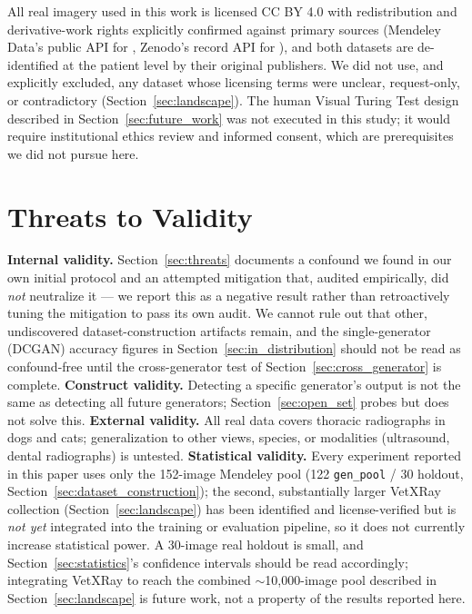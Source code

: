 \documentclass[journal]{IEEEtran}
\begin{document}
All real imagery used in this work is licensed CC BY 4.0 with redistribution and derivative-work rights explicitly confirmed against primary sources (Mendeley Data's public API for \cite{mendeley_vhs_dataset}, Zenodo's record API for \cite{vetxray_2026}), and both datasets are de-identified at the patient level by their original publishers. We did not use, and explicitly excluded, any dataset whose licensing terms were unclear, request-only, or contradictory (Section~\ref{sec:landscape}). The human Visual Turing Test design described in Section~\ref{sec:future_work} was not executed in this study; it would require institutional ethics review and informed consent, which are prerequisites we did not pursue here.

\section{Threats to Validity}
\label{sec:validity}

\textbf{Internal validity.} Section~\ref{sec:threats} documents a confound we found in our own initial protocol and an attempted mitigation that, audited empirically, did \emph{not} neutralize it — we report this as a negative result rather than retroactively tuning the mitigation to pass its own audit. We cannot rule out that other, undiscovered dataset-construction artifacts remain, and the single-generator (DCGAN) accuracy figures in Section~\ref{sec:in_distribution} should not be read as confound-free until the cross-generator test of Section~\ref{sec:cross_generator} is complete. \textbf{Construct validity.} Detecting a specific generator's output is not the same as detecting all future generators; Section~\ref{sec:open_set} probes but does not solve this. \textbf{External validity.} All real data covers thoracic radiographs in dogs and cats; generalization to other views, species, or modalities (ultrasound, dental radiographs) is untested. \textbf{Statistical validity.} Every experiment reported in this paper uses only the 152-image Mendeley pool (122 \texttt{gen\_pool} / 30 holdout, Section~\ref{sec:dataset_construction}); the second, substantially larger VetXRay collection (Section~\ref{sec:landscape}) has been identified and license-verified but is \emph{not yet} integrated into the training or evaluation pipeline, so it does not currently increase statistical power. A 30-image real holdout is small, and Section~\ref{sec:statistics}'s confidence intervals should be read accordingly; integrating VetXRay to reach the combined $\sim$10{,}000-image pool described in Section~\ref{sec:landscape} is future work, not a property of the results reported here.
\end{document}
